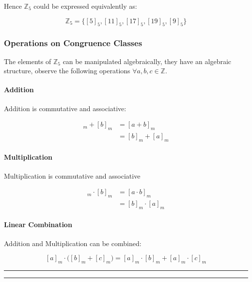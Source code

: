 \documentclass[
]{article}
\begin{document}
Hence \(\mathbb{Z}_5\) could be expressed equivalently as:

\[\mathbb{Z}_5 = \{[5]_5, [11]_5, [17]_5, [19]_5, [9]_5\}\]

\hypertarget{header-n491}{%
\subsubsection{Operations on Congruence Classes}\label{header-n491}}

The elements of \(\mathbb{Z}_5\) can be manipulated algebraically, they
have an algebraic structure, observe the following operations
\(\forall a,b,c \in \mathbb{Z}\).

\hypertarget{header-n493}{%
\paragraph{Addition }\label{header-n493}}

Addition is commutative and associative:

\begin{align}
[a]_m + [b]_m &= [a+b]_m \\
&= [b]_m + [a]_m
\end{align}

\hypertarget{header-n496}{%
\paragraph{Multiplication }\label{header-n496}}

Multiplication is commutative and associative

\begin{align}
[a]_m \cdot [b]_m &= [a\cdot b]_m\\
&= [b]_m \cdot  [a]_m
\end{align}

\hypertarget{header-n499}{%
\paragraph{Linear Combination}\label{header-n499}}

Addition and Multiplication can be combined:

\[[a]_m \cdot \big( [b]_m + [c]_m \big) = [a]_m \cdot [b]_m + [a]_m \cdot [c]_m\]

\begin{center}\rule{0.5\linewidth}{\linethickness}\end{center}

\begin{center}\rule{0.5\linewidth}{\linethickness}\end{center}
\end{document}

